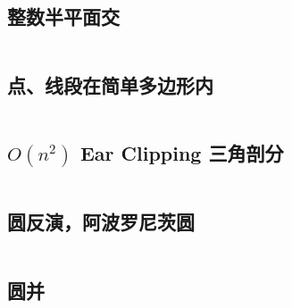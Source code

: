 \documentclass[titlepage, a4paper]{article}
\begin{document}
\begin{multicols}{2}
\begin{spacing}{0.6}
				\subsection{整数半平面交}
					\inputminted{cpp}{src/Geometry/integral_hpi.cpp}
				\subsection{点、线段在简单多边形内}
					\inputminted{cpp}{src/Geometry/AirportConstruction.cpp}
				\subsection{$O(n ^ 2)$ Ear Clipping 三角剖分}
					\inputminted{cpp}{src/Geometry/Triangulation.cpp}
				
				\subsection{圆反演，阿波罗尼茨圆}
				\begin{small}
					
				\end{small}
					\inputminted{cpp}{src/yzh/circle_inversion.cpp}
				\subsection{圆并}
					\inputminted{cpp}{src/Geometry/圆并.cpp}
				

\end{spacing}
\end{multicols}
\end{document}
